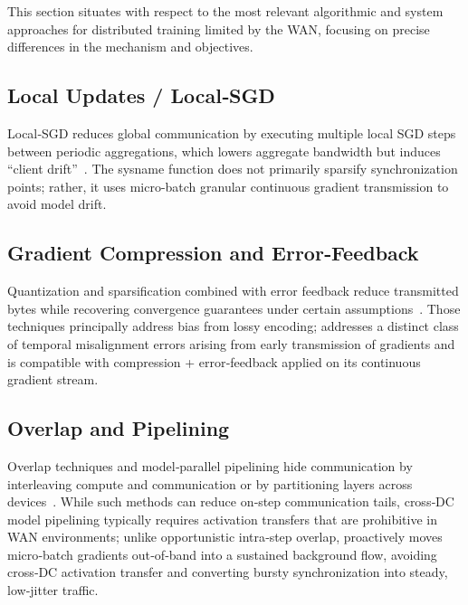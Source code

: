 \label{related-work}

This section situates \sysname{} with respect to the most relevant algorithmic and system approaches for distributed training limited by the WAN, focusing on precise differences in the mechanism and objectives.

\subsection{Local Updates / Local‑SGD}
Local‑SGD reduces global communication by executing multiple local SGD steps between periodic aggregations, which lowers aggregate bandwidth but induces ``client drift''~\cite{stich2019local, stich2018sparsified, compensatefedavg}. The sysname{} function does not primarily sparsify synchronization points; rather, it uses micro-batch granular continuous gradient transmission to avoid model drift.

\subsection{Gradient Compression and Error‑Feedback}
Quantization and sparsification combined with error feedback reduce transmitted bytes while recovering convergence guarantees under certain assumptions~\cite{DBLP:conf/dac/WangWLK25, zhang2023errorfeedback, zhou2023integrating, DBLP:conf/icml/XuH22}. Those techniques principally address bias from lossy encoding; \sysname{} addresses a distinct class of temporal misalignment errors arising from early transmission of gradients and is compatible with compression + error‑feedback applied on its continuous gradient stream.

\subsection{Overlap and Pipelining}
Overlap techniques and model‑parallel pipelining hide communication by interleaving compute and communication or by partitioning layers across devices~\cite{gpipe, pipedream, zerobubble}. While such methods can reduce on‑step communication tails, cross‑DC model pipelining typically requires activation transfers that are prohibitive in WAN environments; unlike opportunistic intra‑step overlap, \sysname{} proactively moves micro‑batch gradients out‑of‑band into a sustained background flow, avoiding cross‑DC activation transfer and converting bursty synchronization into steady, low‑jitter traffic.

